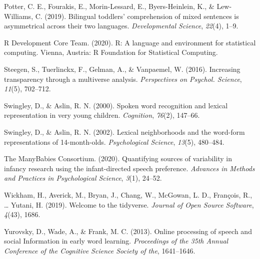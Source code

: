 \documentclass[10pt, letterpaper]{article}
\begin{document}
\leavevmode\hypertarget{ref-Potter2019}{}%
Potter, C. E., Fourakis, E., Morin-Lessard, E., Byers-Heinlein, K., \&
Lew-Williams, C. (2019). Bilingual toddlers' comprehension of mixed
sentences is asymmetrical across their two languages.
\emph{Developmental Science}, \emph{22}(4), 1--9.

\leavevmode\hypertarget{ref-RDevelopmentCoreTeam2010}{}%
R Development Core Team. (2020). R: A language and environment for
statistical computing. Vienna, Austria: R Foundation for Statistical
Computing.

\leavevmode\hypertarget{ref-steegenEtAl2016}{}%
Steegen, S., Tuerlinckx, F., Gelman, A., \& Vanpaemel, W. (2016).
Increasing transparency through a multiverse analysis.
\emph{Perspectives on Psychol. Science}, \emph{11}(5), 702--712.

\leavevmode\hypertarget{ref-Swingley2000}{}%
Swingley, D., \& Aslin, R. N. (2000). Spoken word recognition and
lexical representation in very young children. \emph{Cognition},
\emph{76}(2), 147--66.

\leavevmode\hypertarget{ref-Swingley2002}{}%
Swingley, D., \& Aslin, R. N. (2002). Lexical neighborhoods and the
word-form representations of 14-month-olds. \emph{Psychological
Science}, \emph{13}(5), 480--484.

\leavevmode\hypertarget{ref-TheManyBabiesConsortium2020}{}%
The ManyBabies Consortium. (2020). Quantifying sources of variability in
infancy research using the infant-directed speech preference.
\emph{Advances in Methods and Practices in Psychological Science},
\emph{3}(1), 24--52.

\leavevmode\hypertarget{ref-Wickham2019}{}%
Wickham, H., Averick, M., Bryan, J., Chang, W., McGowan, L. D.,
François, R., \ldots{} Yutani, H. (2019). Welcome to the tidyverse.
\emph{Journal of Open Source Software}, \emph{4}(43), 1686.

\leavevmode\hypertarget{ref-Yurovsky2013}{}%
Yurovsky, D., Wade, A., \& Frank, M. C. (2013). Online processing of
speech and social Information in early word learning. \emph{Proceedings
of the 35th Annual Conference of the Cognitive Science Society of the},
1641--1646.


\end{document}
